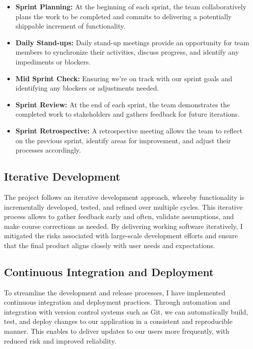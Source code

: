 \documentclass[12pt,a4paper]{report}
\begin{document}
\begin{itemize}
    \item \textbf{Sprint Planning:} At the beginning of each sprint, the team collaboratively plans the work to be completed and commits to delivering a potentially shippable increment of functionality. 
    \item \textbf{Daily Stand-ups:} Daily stand-up meetings provide an opportunity for team members to synchronize their activities, discuss progress, and identify any impediments or blockers. 
    \item \textbf{Mid Sprint Check:} Ensuring we're on track with our sprint goals and identifying any blockers or adjustments needed.
    \item \textbf{Sprint Review:} At the end of each sprint, the team demonstrates the completed work to stakeholders and gathers feedback for future iterations. 
    \item \textbf{Sprint Retrospective:} A retrospective meeting allows the team to reflect on the previous sprint, identify areas for improvement, and adjust their processes accordingly.
\end{itemize}

\subsection{Iterative Development}
The project follows an iterative development approach, whereby functionality is incrementally developed, tested, and refined over multiple cycles. This iterative process allows to gather feedback early and often, validate assumptions, and make course corrections as needed. By delivering working software iteratively, I mitigated the risks associated with large-scale development efforts and ensure that the final product aligns closely with user needs and expectations.


\subsection{Continuous Integration and Deployment}
To streamline the development and release processes, I have implemented continuous integration and deployment practices. Through automation and integration with version control systems such as Git, we can automatically build, test, and deploy changes to our application in a consistent and reproducible manner. This enables to deliver updates to our users more frequently, with reduced risk and improved reliability.
\end{document}
